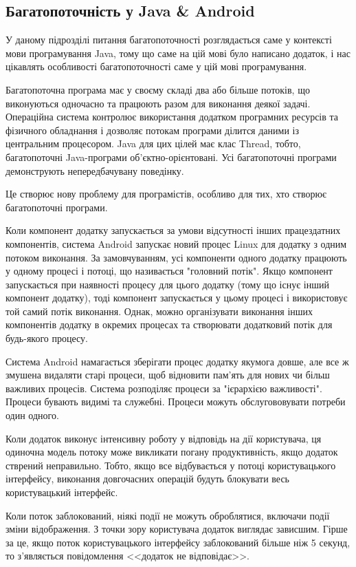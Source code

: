 \subsection{Багатопоточність у Java \& Android}

У даному підрозділі питання багатопоточності розглядається саме у контексті мови програмування Java, тому що саме на цій мові було написано додаток, і нас цікавлять особливості багатопоточності саме у цій мові програмування.

Багатопоточна програма має у своєму складі два або більше потоків, що виконуються одночасно та працюють разом для виконання деякої задачі. Операційна система контролює використання додатком програмних ресурсів та фізичного обладнання і дозволяє потокам програми ділится даними із центральним процесором. Java для цих цілей має клас Thread, тобто, багатопоточні Java-програми об'єктно-орієнтовані. Усі багатопоточні програми демонструють непередбачувану поведінку.

Це створює нову проблему для програмістів, особливо для тих, хто створює багатопоточні програми. \cite{carver2005modern}

Коли компонент додатку запускається за умови відсутності інших працездатних компонентів, система Android запускає новий процес Linux для додатку з одним потоком виконання. За замовчуванням, усі компоненти одного додатку працюють у одному процесі і потоці, що називається "головний потік". Якщо компонент запускається при наявності процесу для цього додатку (тому що існує інший компонент додатку), тоді компонент запускається у цьому процесі і використовує той самий потік виконання. Однак, можно організувати виконання інших компонентів додатку в окремих процесах та створювати додатковий потік для будь-якого процесу.

Система Android намагається зберігати процес додатку якумога довше, але все ж змушена видаляти старі процеси, щоб відновити пам'ять для нових чи більш важливих процесів. Система розподіляє процеси за "ієрархією важливості". Процеси бувають видимі та служебні. Процеси можуть обслугововувати потреби один одного.

Коли додаток виконує інтенсивну роботу у відповідь на дії користувача, ця одиночна модель потоку може викликати погану продуктивність, якщо додаток стврений неправильно. Тобто, якщо все відбувається у потоці користувацького інтерфейсу, виконання довгочасних операцій будуть блокувати весь користувацький інтерфейс.

Коли поток заблокований, ніякі події не можуть оброблятися, включачи події зміни відображення. З точки зору користувача додаток виглядає зависшим. Гірше за це, якщо поток користувацького інтерфейсу заблокований більше ніж 5 секунд, то з'являється повідомлення <<додаток не відповідає>>.

